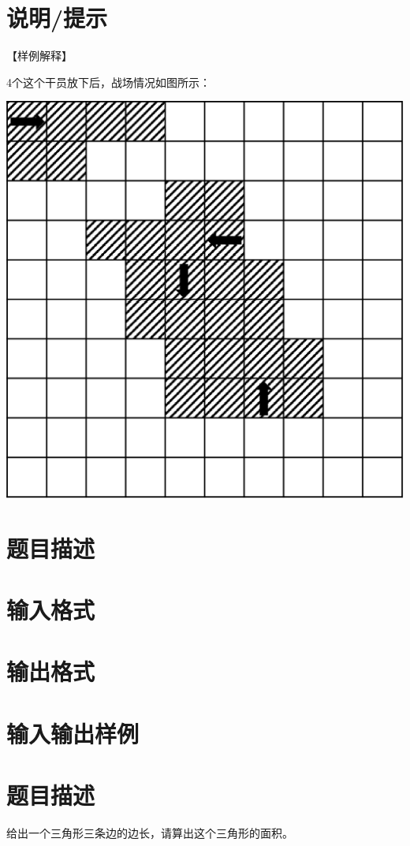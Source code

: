 \documentclass{ctpro}
\begin{document}
\section*{说明/提示}
【样例解释】

4个这个干员放下后，战场情况如图所示：

\begin{center}
	\includegraphics{images/battlefield.png}
\end{center}

\makeproblem
\section*{题目描述}
\section*{输入格式}
\section*{输出格式}
\section*{输入输出样例}

\makeproblem
\section*{题目描述}
给出一个三角形三条边的边长，请算出这个三角形的面积。
\end{document}
